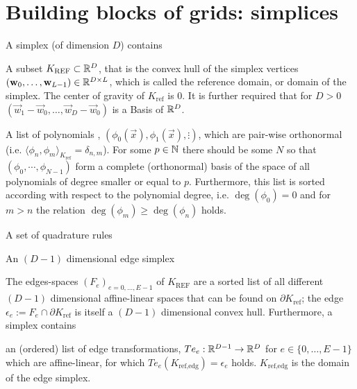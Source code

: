 \section{Building blocks of grids: simplices}


\begin{myDef}[Simplex]
A simplex  (of dimension $D$) contains
\begin{packed_itemize}
  \item A subset $K_\textrm{REF} \subset \mathbb{R}^D$, that is the convex hull of the
        simplex vertices
         $\left( \vec{w}_0,\ldots,\vec{w}_{L-1} \right) \in \real^{D \times L}$,
         which is called the reference domain, or domain of the simplex.
         The center of gravity of $K_\textrm{ref}$ is $0$. It is further required that
         for $D > 0$
         $\left(\vec{w}_1 - \vec{w}_0,\ldots,\vec{w}_D - \vec{w}_0\right)$
         is a Basis of $\mathbb{R}^D$.
  \item A list of polynomials
        ,
        $\left( \phi_0(\vec{x}),\phi_1(\vec{x}),\vdots \right)$,
        which are pair-wise orthonormal 
        (i.e. $\langle \phi_n, \phi_m \rangle_{K_\textrm{ref}} = \delta_{n,m}$).
        For some $p \in \mathbb{N}$ there should be some $N$ so that
        $(\phi_0,\cdots,\phi_{N-1})$ form a complete (orthonormal) basis of the space of all
        polynomials of degree smaller or equal to $p$.
        Furthermore, this list is
        sorted according with respect to the polynomial degree, i.e.
        $\deg (\phi_0) = 0$ and for $m>n$ the relation $\deg(\phi_m) \geq \deg(\phi_n)$ holds.
  \item A set of quadrature rules
  \item An $(D-1)$ dimensional edge simplex
\end{packed_itemize}
The edges-spaces $ \left( F_e \right)_{e=0,\ldots,E-1}$ of $K_\textrm{REF}$ are a sorted list of all
different $(D-1)$  dimensional affine-linear spaces that can be found on $\partial K_\textrm{ref}$;
the edge $\epsilon_e := F_e \cap \partial K_\textrm{ref}$ is itself a $(D-1)$ dimensional convex hull.
Furthermore, a simplex contains
\begin{packed_itemize}
  \item an (ordered) list of edge transformations,
        $Te_e : \mathbb{R}^{D-1} \rightarrow \mathbb{R}^D$ for $e \in \{0,\ldots,E-1\}$ which are affine-linear,
        for which $Te_e(K_{\textrm{ref,edg}}) = \epsilon_e$ holds.
        $K_{\textrm{ref,edg}}$ is the domain of the edge simplex.
\end{packed_itemize}
\label{simplex}
\end{myDef}


